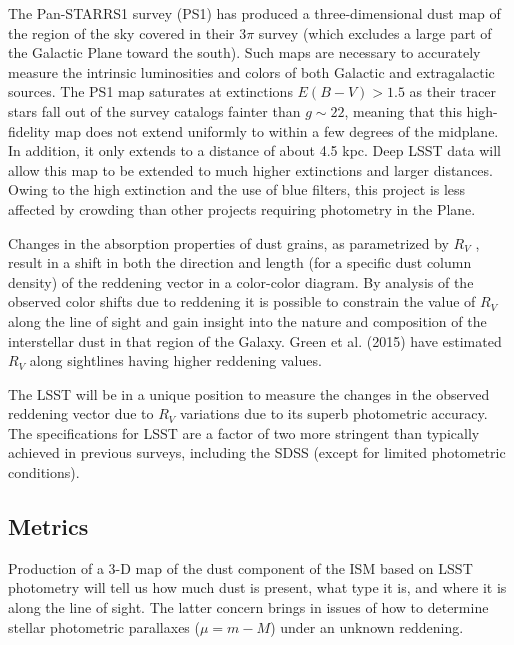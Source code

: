 The Pan-STARRS1 survey (PS1) has
produced a three-dimensional dust map of the region of the sky covered
in their 3$\pi$ survey (which excludes a large part of the Galactic
Plane toward the south). Such maps are necessary to accurately measure
the intrinsic luminosities and colors of both Galactic and
extragalactic sources. The PS1 map saturates at
extinctions $E(B-V) > 1.5$ as their tracer stars fall out of the
survey catalogs fainter than $g\sim 22$, meaning that this
high-fidelity map does not extend uniformly to within a few degrees of
the midplane. In addition, it only extends to a distance of about 4.5
kpc. Deep LSST data will allow this map to be extended to much higher
extinctions and larger distances. Owing to the high extinction and the
use of blue filters, this project is less affected by crowding than
other projects requiring photometry in the Plane. 

Changes in the absorption properties of dust grains, as parametrized by $R_V$ , result in a shift in
both the direction and length (for a specific dust column density) of the reddening vector in a
color-color diagram.
By analysis of the observed color shifts due to reddening it is possible to constrain the value of $R_V$
along the line of sight and gain insight into the nature and composition of the interstellar dust in
that region of the Galaxy. Green et al. (2015) have estimated $R_V$ along sightlines having higher 
reddening values.

The LSST will be in a unique position to measure the changes in the observed reddening vector
due to $R_V$ variations due to its superb photometric accuracy. The specifications for
LSST are a factor of two more stringent than typically achieved in previous surveys, including the
SDSS (except for limited photometric conditions).



\subsection{Metrics}

\label{sec:\secname:metrics}

Production of a 3-D map of the dust component of the ISM based on LSST photometry will tell us 
how much dust is present, what type it is, and where it is along the line of sight. 
The latter concern brings in issues of how to determine stellar photometric parallaxes ($\mu = m-M$) under
an unknown reddening.

